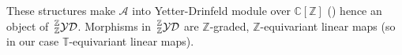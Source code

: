 \documentclass[12pt,reqno,a4paper]{amsart}
\theoremstyle{definition}
\newcommand{\tens}{\otimes}
\newcommand{\CC}{\mathbb{C}}
\newcommand{\TT}{\mathbb{T}}
\newcommand{\ZZ}{\mathbb{Z}}
\newcommand{\cA}{\mathscr{A}}
\numberwithin{equation}{section}
\begin{document}
These structures make $\cA$ into Yetter-Drinfeld module over $\CC[\ZZ]$ (\cite[Definition 1.4.1]{HeckenbergerSchneider}) hence an object of $\sideset{_\ZZ^\ZZ}{}{\operatorname{\mathcal{YD}}}$. Morphisms in $\sideset{_\ZZ^\ZZ}{}{\operatorname{\mathcal{YD}}}$ are $\ZZ$-graded, $\ZZ$-equivariant linear maps (so in our case $\TT$-equivariant linear maps).
%
\end{document}
